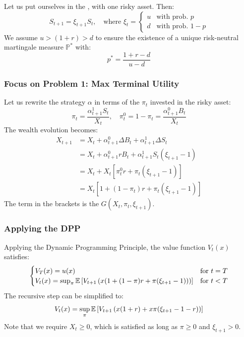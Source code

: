 Let us put ourselves in the , with one risky asset. Then:
\begin{equation}
    S_{t+1} = \xi_{t+1} S_t, \quad \text{where } \xi_t = \begin{cases} u & \text{with prob. } p \\ d & \text{with prob. } 1-p \end{cases}
\end{equation}
We assume $u > (1+r) > d$ to ensure the existence of a unique risk-neutral martingale measure $\mathbb{P}^*$ with:
\begin{equation}
    p^* = \frac{1+r-d}{u-d}
\end{equation}

\subsubsection{Focus on Problem 1: Max Terminal Utility}

Let us rewrite the strategy $\alpha$ in terms of the  $\pi_t$ invested in the risky asset:
\begin{equation}
    \pi_t = \frac{\alpha_{t+1}^1 S_t}{X_t}, \quad \pi_t^0 = 1 - \pi_t = \frac{\alpha_{t+1}^0 B_t}{X_t}
\end{equation}
The wealth evolution becomes:
\begin{align*}
    X_{t+1} &= X_t + \alpha_{t+1}^0 \Delta B_t + \alpha_{t+1}^1 \Delta S_t \\
    &= X_t + \alpha_{t+1}^0 r B_t + \alpha_{t+1}^1 S_t (\xi_{t+1} - 1) \\
    &= X_t + X_t \left[ \pi_t^0 r + \pi_t (\xi_{t+1} - 1) \right] \\
    &= X_t \left[ 1 + (1-\pi_t)r + \pi_t(\xi_{t+1} - 1) \right]
\end{align*}
The term in the brackets is the  $G(X_t, \pi_t, \xi_{t+1})$.

\subsubsection{Applying the DPP}

Applying the Dynamic Programming Principle, the value function $V_t(x)$ satisfies:
\begin{equation}
    \begin{cases} 
    V_T(x) = u(x) & \text{for } t = T \\
    V_t(x) = \sup_{\pi} \mathbb E \left[ V_{t+1} \left( x(1 + (1-\pi)r + \pi(\xi_{t+1}-1)) \right) \right] & \text{for } t < T
    \end{cases}
\end{equation}
The recursive step can be simplified to:
\begin{equation}
    V_t(x) = \sup_{\pi} \mathbb E \left[ V_{t+1} \left( x(1+r) + x\pi(\xi_{t+1} - 1 - r) \right) \right]
\end{equation}
Note that we require $X_t \geq 0$, which is satisfied as long as $\pi \geq 0$ and $\xi_{t+1} > 0$.

